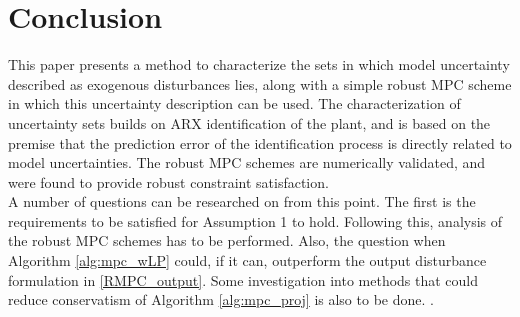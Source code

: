 \documentclass[letterpaper, 10 pt, conference]{ieeeconf}  %
\begin{document}
\section{Conclusion}
This paper presents a method to characterize the sets in which model uncertainty described as exogenous disturbances lies, along with a simple robust MPC scheme in which this uncertainty description can be used. The characterization of uncertainty sets builds on ARX identification of the plant, and is based on the premise that the prediction error of the identification process is directly related to model uncertainties. The robust MPC schemes are numerically validated, and were found to provide robust constraint satisfaction. 
\\
A number of questions can be researched on from this point. The first is the requirements to be satisfied for Assumption 1 to hold. Following this, analysis of the robust MPC schemes has to be performed. Also, the question when Algorithm \ref{alg:mpc_wLP} could, if it can, outperform the output disturbance formulation in \ref{RMPC_output}. Some investigation into methods that could reduce conservatism of Algorithm \ref{alg:mpc_proj} is also to be done.
. 
\end{document}
